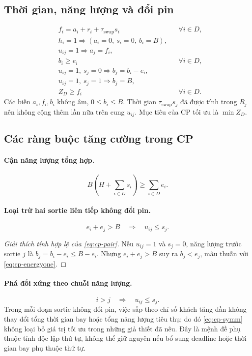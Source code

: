 \documentclass[11pt,a4paper]{article}
\theoremstyle{definition}
\theoremstyle{plain}
\theoremstyle{remark}
\newcommand{\sw}{\tau_{\mathrm{swap}}}
\begin{document}
\subsection{Thời gian, năng lượng và đổi pin}
\begin{align}
&f_i=a_i+r_i+\sw s_i &&\forall i\in D,\label{eq:cp-duration}\\
&h_i=1\Rightarrow (a_i=0,\ s_i=0,\ b_i=B),\label{eq:cp-initial}\\
&u_{ij}=1\Rightarrow a_j=f_i,\label{eq:cp-timing}\\
&b_i\ge e_i &&\forall i\in D,\label{eq:cp-energyone}\\
&u_{ij}=1,\ s_j=0\Rightarrow b_j=b_i-e_i,\label{eq:cp-remain}\\
&u_{ij}=1,\ s_j=1\Rightarrow b_j=B,\label{eq:cp-reset}\\
&Z_D\ge f_i &&\forall i\in D.\label{eq:cp-Z}
\end{align}
Các biến $a_i,f_i,b_i$ không âm, $0\le b_i\le B$. Thời gian $\sw s_j$ đã được tính trong $R_j$ nên không cộng thêm lần nữa trên cung $u_{ij}$. Mục tiêu của CP tối ưu là $\min Z_D$.

\subsection{Các ràng buộc tăng cường trong CP}
\paragraph{Cận năng lượng tổng hợp.}
\begin{equation}\label{eq:cp-agg}
B\left(H+\sum_{i\in D}s_i\right)\ge\sum_{i\in D}e_i.
\end{equation}
\paragraph{Loại trừ hai sortie liên tiếp không đổi pin.}
\begin{equation}\label{eq:cp-pair}
e_i+e_j>B\quad\Longrightarrow\quad u_{ij}\le s_j.
\end{equation}
\begin{proof}[Giải thích tính hợp lệ của \eqref{eq:cp-pair}]
Nếu $u_{ij}=1$ và $s_j=0$, năng lượng trước sortie $j$ là $b_j=b_i-e_i\le B-e_i$. Nhưng $e_i+e_j>B$ suy ra $b_j<e_j$, mâu thuẫn với \eqref{eq:cp-energyone}.\end{proof}
\paragraph{Phá đối xứng theo chuỗi năng lượng.}
\begin{equation}\label{eq:cp-symm}
i>j\quad\Longrightarrow\quad u_{ij}\le s_j.
\end{equation}
Trong mỗi đoạn sortie không đổi pin, việc sắp theo chỉ số khách tăng dần không thay đổi tổng thời gian bay hoặc tổng năng lượng tiêu thụ; do đó \eqref{eq:cp-symm} không loại bỏ giá trị tối ưu trong những giả thiết đã nêu. Đây là mệnh đề phụ thuộc tính độc lập thứ tự, không thể giữ nguyên nếu bổ sung deadline hoặc thời gian bay phụ thuộc thứ tự.
\end{document}
